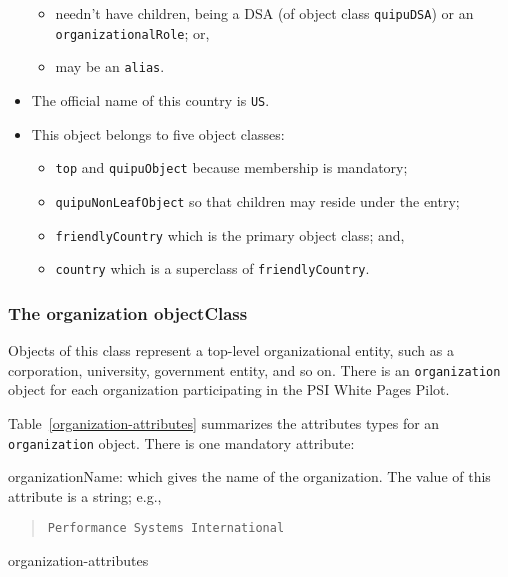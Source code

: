 \begin{itemize}
\begin{itemize}
     \item	needn't have children, being a DSA
		(of object class \verb"quipuDSA")
		or an \verb"organizationalRole";
		or,

    \item	may be an \verb"alias".
    \end{itemize}

\item	The official name of this country is \verb"US".

\item	This object belongs to five object classes:
    \begin{itemize}
    \item	\verb"top" and \verb"quipuObject" because membership is
		mandatory;

    \item	\verb"quipuNonLeafObject" so that children may reside
		under the entry;

    \item	\verb"friendlyCountry" which is the primary object class; and,

    \item	\verb"country" which is a superclass of \verb"friendlyCountry".
    \end{itemize}
\end{itemize}

\subsubsection	{The organization objectClass}
Objects of this class represent a top-level organizational entity,
such as a corporation, university, government entity, and so on.
There is an \verb"organization" object for each organization participating in
the PSI White Pages Pilot.

Table~\ref{organization-attributes} summarizes the attributes types for
an \verb"organization" object.
There is one mandatory attribute:
\begin{describe}
\item[organizationName:]
			which gives the name of the organization.
			The value of this attribute is a string; e.g.,
\begin{quote}\small\begin{verbatim}
Performance Systems International
\end{verbatim}\end{quote}
\end{describe}
%
	{organization-attributes}

